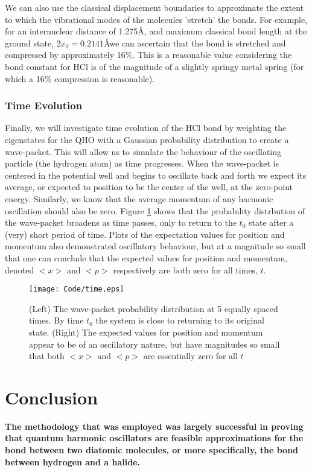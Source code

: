 \documentclass[11pt]{article}
\begin{document}
We can also use the classical displacement boundaries to approximate the extent to which the vibrational modes of the molecules 'stretch' the bonds. For example, for an internuclear distance of 1.275\AA \cite{RefWorks:3}, and maximum classical bond length at the ground state, $2x_{0}=0.2141$\AA we can ascertain that the bond is stretched and compressed by approximately 16\%. This is a reasonable value considering the bond constant for HCl is of the magnitude of a slightly springy metal spring (for which a 16\% compression is reasonable).

\subsubsection{Time Evolution}
Finally, we will investigate time evolution of the HCl bond by weighting the eigenstates for the QHO with a Gaussian probability distribution to create a wave-packet. This will allow us to simulate the behaviour of the oscillating particle (the hydrogen atom) as time progresses. When the wave-packet is centered in the potential well and begins to oscillate back and forth we expect its average, or expected to position to be the center of the well, at the zero-point energy. Similarly, we know that the average momentum of any harmonic oscillation should also be zero. Figure \ref{fig:time} shows that the probability distrbution of the wave-packet broadens as time passes, only to return to the $t_0$ state after a (very) short period of time. Plots of the expectation values for position and momentum also demonstrated oscillatory behaviour, but at a magnitude so small that one can conclude that the expected values for position and momentum, denoted $<x>$ and $<p>$ respectively are both zero for all times, $t$.

\begin{figure}[h]
\begin{center}
\texttt{[image: Code/time.eps]}
\caption[time plot]{(Left) The wave-packet probability distribution at 5 equally spaced times. By time $t_6$ the system is close to returning to its original state. (Right) The expected values for position and momentum appear to be of an oscillatory nature, but have magnitudes so small that both $<x>$ and $<p>$ are essentially zero for all $t$}
\label{fig:time}
\end{center}
\end{figure}

\section{Conclusion}
\textbf{The methodology that was employed was largely successful in proving that quantum harmonic oscillators are feasible approximations for the bond between two diatomic molecules, or more specifically, the bond between hydrogen and a halide.}
\end{document}

